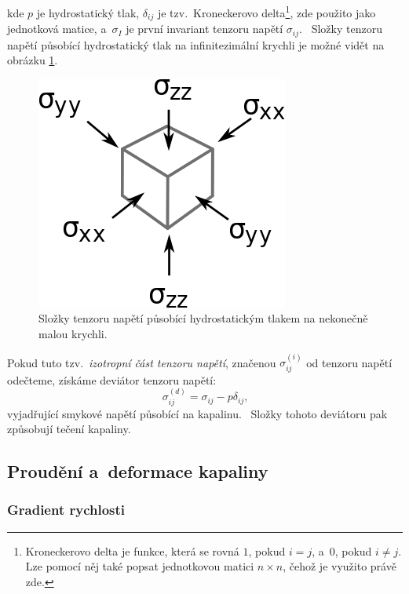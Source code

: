 \documentclass[12pt]{article}
\begin{document}
kde $p$ je hydrostatický tlak, $\delta_{ij}$ je tzv.~Kroneckerovo delta\footnote{Kroneckerovo delta je funkce, která se rovná $1$, pokud $i = j$, a~$0$, pokud $i \neq j$. Lze pomocí něj také popsat jednotkovou matici $n \times n$, čehož je využito právě zde.}, zde použito jako jednotková matice, a~$\sigma_I$ je první invariant tenzoru napětí $\sigma_{ij}$.~\cite{material:Hydrostatika_a_hydrodynamika}\cite{wiki:Kroneckerovo_delta}\cite{wiki:Identity_matrix}
Složky tenzoru napětí působící hydrostatický tlak na infinitezimální krychli je možné vidět na obrázku \ref{fig:tlak}.

\begin{figure}
    \centering
    \includegraphics[width = 0.3\linewidth]{figures/Hydrostatic_Stress.png}
    \caption{Složky tenzoru napětí působící hydrostatickým tlakem na nekonečně malou krychli.~\cite{Figure:hydrostatický_tlak}}
    \label{fig:tlak}
\end{figure}

Pokud tuto tzv.~\emph{izotropní část tenzoru napětí}, značenou $\sigma_{ij}^{(i)}$ od tenzoru napětí odečteme, získáme deviátor tenzoru napětí:
\begin{equation}
    \sigma_{ij}^{(d)} = \sigma_{ij} - p\delta_{ij}\text{,}
\end{equation}
vyjadřující smykové napětí působící na kapalinu.~\cite{online:Skripta_deviátor}\cite{wiki:Deformace} Složky tohoto deviátoru pak způsobují tečení kapaliny.

\subsection{Proudění a~deformace kapaliny}%

\subsubsection{Gradient rychlosti}%
\end{document}

